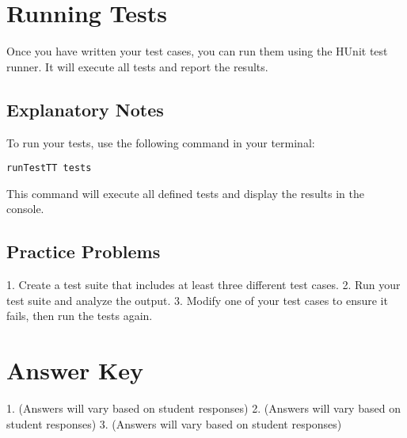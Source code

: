 \documentclass{article}
\begin{document}
\section*{Running Tests}
Once you have written your test cases, you can run them using the HUnit test runner. It will execute all tests and report the results.

\subsection*{Explanatory Notes}
To run your tests, use the following command in your terminal:

\begin{verbatim}
runTestTT tests
\end{verbatim}

This command will execute all defined tests and display the results in the console.

\subsection*{Practice Problems}
1. Create a test suite that includes at least three different test cases.
2. Run your test suite and analyze the output.
3. Modify one of your test cases to ensure it fails, then run the tests again.

\section*{Answer Key}
1. (Answers will vary based on student responses)
2. (Answers will vary based on student responses)
3. (Answers will vary based on student responses)
\end{document}
